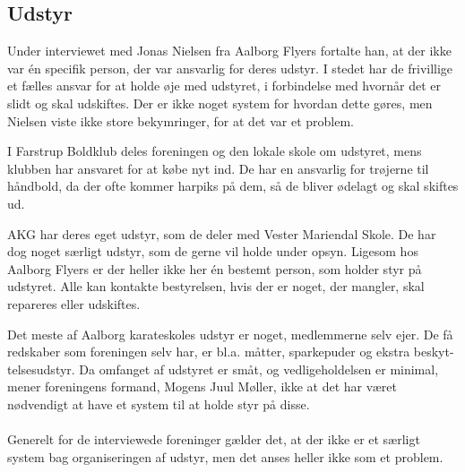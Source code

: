 \subsection*{Udstyr}
Under interviewet med Jonas Nielsen fra Aalborg Flyers fortalte han, at der ikke var én specifik person, der var ansvarlig for deres udstyr. I stedet har de frivillige et fælles ansvar for at holde øje med udstyret, i forbindelse med hvornår det er slidt og skal udskiftes. Der er ikke noget system for hvordan dette gøres, men Nielsen viste ikke store bekymringer, for at det var et problem.
\par
I Farstrup Boldklub deles foreningen og den lokale skole om udstyret, mens klubben har ansvaret for at købe nyt ind. De har en ansvarlig for trøjerne til håndbold, da der ofte kommer harpiks på dem, så de bliver ødelagt og skal skiftes ud.
\par
AKG har deres eget udstyr, som de deler med Vester Mariendal Skole. De har dog noget særligt udstyr, som de gerne vil holde under opsyn. Ligesom hos Aalborg Flyers er der heller ikke her én bestemt person, som holder styr på udstyret. Alle kan kontakte bestyrelsen, hvis der er noget, der mangler, skal repareres eller udskiftes. 
\par
Det meste af Aalborg karateskoles udstyr er noget, medlemmerne selv ejer. De få redskaber som foreningen selv har, er bl.a. måtter, sparkepuder og ekstra beskyt-telsesudstyr. Da omfanget af udstyret er småt, og vedligeholdelsen er minimal, mener foreningens formand, Mogens Juul Møller, ikke at det har været nødvendigt at have et system til at holde styr på disse.
\\\\
Generelt for de interviewede foreninger gælder det, at der ikke er et særligt system bag organiseringen af udstyr, men det anses heller ikke som et problem. 

